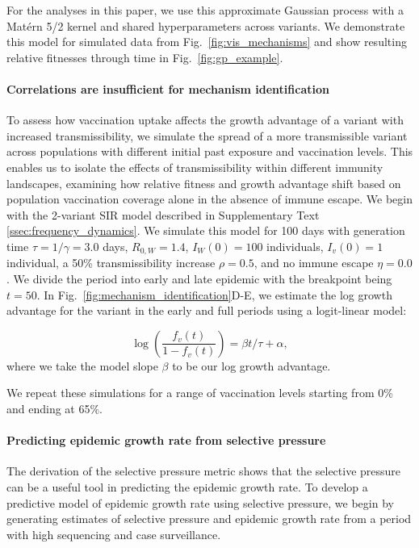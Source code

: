 \documentclass[11pt,oneside,letterpaper]{article}
\newcommand{\wt}{W}
\newcommand{\varEscape}{\eta}
\newcommand{\varTransmission}{\rho}
\begin{document}
For the analyses in this paper, we use this approximate Gaussian process with a Mat\'ern 5/2 kernel and shared hyperparameters across variants.
We demonstrate this model for simulated data from Fig.~\ref{fig:vis_mechanisms} and show resulting relative fitnesses through time in Fig.~\ref{fig:gp_example}.

\paragraph{Correlations are insufficient for mechanism identification}

To assess how vaccination uptake affects the growth advantage of a variant with increased transmissibility, we simulate the spread of a more transmissible variant across populations with different initial past exposure and vaccination levels.
This enables us to isolate the effects of transmissibility within different immunity landscapes, examining how relative fitness and growth advantage shift based on population vaccination coverage alone in the absence of immune escape.
We begin with the 2-variant SIR model described in Supplementary Text \ref{ssec:frequency_dynamics}.
We simulate this model for 100 days with generation time $\tau = 1 / \gamma = 3.0$ days, $R_{0, \wt} = 1.4$, $I_{\wt}(0) = 100$ individuals, $I_v(0) = 1$ individual, a 50\% transmissibility increase $\varTransmission=0.5$, and no immune escape $\varEscape=0.0$.
We divide the period into early and late epidemic with the breakpoint being $t=50$.
In Fig.~\ref{fig:mechanism_identification}D-E, we estimate the log growth advantage for the variant in the early and full periods using a logit-linear model:

\begin{equation*}
\log \left( \frac{f_v(t)}{1 - f_v(t)} \right) = \beta t / \tau + \alpha,
\end{equation*}
where we take the model slope $\beta$ to be our log growth advantage.

We repeat these simulations for a range of vaccination levels starting from 0\% and ending at 65\%.

\paragraph{Predicting epidemic growth rate from selective pressure}

The derivation of the selective pressure metric shows that the selective pressure can be a useful tool in predicting the epidemic growth rate.
To develop a predictive model of epidemic growth rate using selective pressure, we begin by generating estimates of selective pressure and epidemic growth rate from a period with high sequencing and case surveillance.
\end{document}
